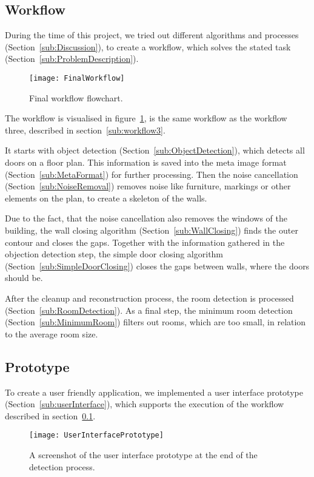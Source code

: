 \subsection{Workflow}
\label{sub:FinalWorkflow}
During the time of this project, we tried out different algorithms and processes (Section~\ref{sub:Discussion}), to create a workflow, which solves the stated task (Section~\ref{sub:ProblemDescription}).

\begin{figure}[H]
	\centering
	\texttt{[image: FinalWorkflow]}
	\caption{Final workflow flowchart.}
	\label{fig:FinalWorkflow}
\end{figure}

The workflow is visualised in figure~\ref{fig:FinalWorkflow}, is the same workflow as the workflow three, described in section~\ref{sub:workflow3}.

It starts with object detection (Section~\ref{sub:ObjectDetection}), which detects all doors on a floor plan. This information is saved into the meta image format (Section~\ref{sub:MetaFormat}) for further processing. Then the noise cancellation (Section~\ref{sub:NoiseRemoval}) removes noise like furniture, markings or other elements on the plan, to create a skeleton of the walls.

Due to the fact, that the noise cancellation also removes the windows of the building, the wall closing algorithm (Section~\ref{sub:WallClosing}) finds the outer contour and closes the gaps. Together with the information gathered in the objection detection step, the simple door closing algorithm (Section~\ref{sub:SimpleDoorClosing}) closes the gaps between walls, where the doors should be.

After the cleanup and reconstruction process, the room detection is processed (Section~\ref{sub:RoomDetection}). As a final step, the minimum room detection (Section~\ref{sub:MinimumRoom}) filters out rooms, which are too small, in relation to the average room size.


\subsection{Prototype}
To create a user friendly application, we implemented a user interface prototype (Section~\ref{sub:userInterface}), which supports the execution of the workflow described in section~\ref{sub:FinalWorkflow}.

\begin{figure}[H]
	\centering
	\texttt{[image: UserInterfacePrototype]}
	\caption{A screenshot of the user interface prototype at the end of the detection process.}
	\label{fig:UserInterfacePrototype}
\end{figure}

